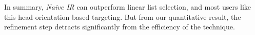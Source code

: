 In summary, {\em Naive IR} can outperform linear list selection, and most users like this head-orientation based targeting. But from our quantitative result, the refinement step detracts significantly from the efficiency of the technique.








